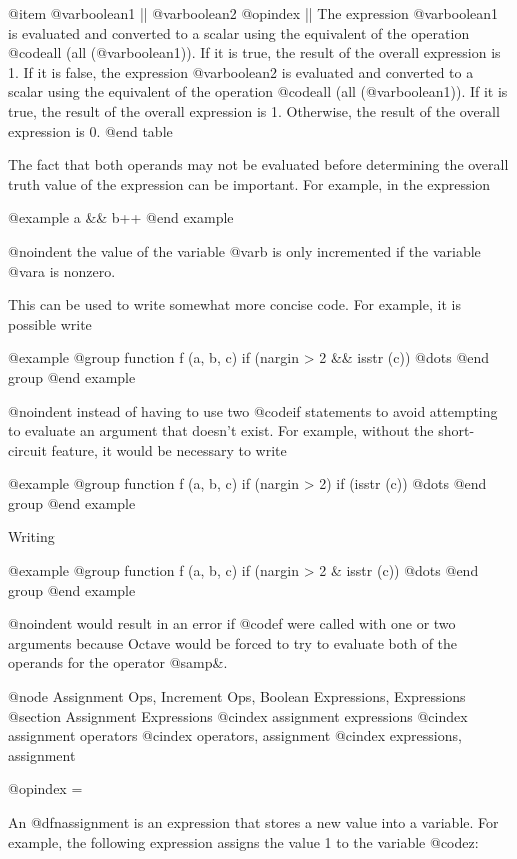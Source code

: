 @item @var{boolean1} || @var{boolean2}
@opindex ||
The expression @var{boolean1} is evaluated and converted to a scalar
using the equivalent of the operation @code{all (all (@var{boolean1}))}.
If it is true, the result of the overall expression is 1.  If it is
false, the expression @var{boolean2} is evaluated and converted to a
scalar using the equivalent of the operation @code{all (all
(@var{boolean1}))}.  If it is true, the result of the overall expression
is 1.  Otherwise, the result of the overall expression is 0.
@end table

The fact that both operands may not be evaluated before determining the
overall truth value of the expression can be important.  For example, in
the expression

@example
a && b++
@end example

@noindent
the value of the variable @var{b} is only incremented if the variable
@var{a} is nonzero.

This can be used to write somewhat more concise code.  For example, it
is possible write

@example
@group
function f (a, b, c)
  if (nargin > 2 && isstr (c))
    @dots{}
@end group
@end example

@noindent
instead of having to use two @code{if} statements to avoid attempting to
evaluate an argument that doesn't exist.  For example, without the
short-circuit feature, it would be necessary to write

@example
@group
function f (a, b, c)
  if (nargin > 2)
    if (isstr (c))
      @dots{}
@end group
@end example

Writing

@example
@group
function f (a, b, c)
  if (nargin > 2 & isstr (c))
    @dots{}
@end group
@end example

@noindent
would result in an error if @code{f} were called with one or two
arguments because Octave would be forced to try to evaluate both of the
operands for the operator @samp{&}.

@node Assignment Ops, Increment Ops, Boolean Expressions, Expressions
@section Assignment Expressions
@cindex assignment expressions
@cindex assignment operators
@cindex operators, assignment
@cindex expressions, assignment

@opindex =

An @dfn{assignment} is an expression that stores a new value into a
variable.  For example, the following expression assigns the value 1 to
the variable @code{z}:

